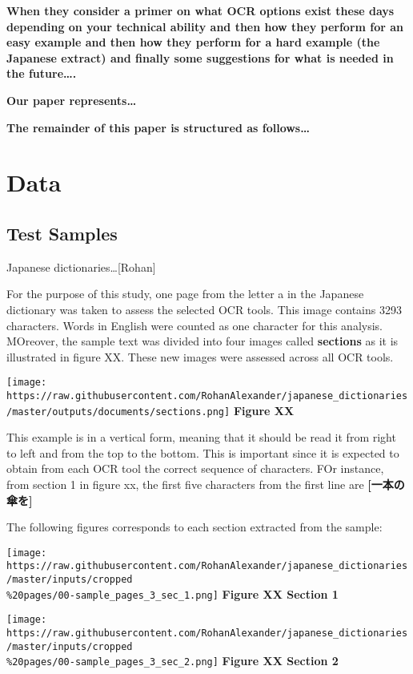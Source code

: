 \documentclass[
]{article}
\begin{document}
\textbf{When they consider a primer on what OCR options exist these days
depending on your technical ability and then how they perform for an
easy example and then how they perform for a hard example (the Japanese
extract) and finally some suggestions for what is needed in the
future\ldots.}

\textbf{Our paper represents\ldots{}}

\textbf{The remainder of this paper is structured as follows\ldots{}}

\hypertarget{data}{%
\section{Data}\label{data}}

\hypertarget{test-samples}{%
\subsection{Test Samples}\label{test-samples}}

Japanese dictionaries\ldots{[}Rohan{]}

For the purpose of this study, one page from the letter a in the
Japanese dictionary was taken to assess the selected OCR tools. This
image contains 3293 characters. Words in English were counted as one
character for this analysis. MOreover, the sample text was divided into
four images called \textbf{sections} as it is illustrated in figure XX.
These new images were assessed across all OCR tools.

\texttt{[image: https://raw.githubusercontent.com/RohanAlexander/japanese\_dictionaries/master/outputs/documents/sections.png]}
\textbf{Figure XX}

This example is in a vertical form, meaning that it should be read it
from right to left and from the top to the bottom. This is important
since it is expected to obtain from each OCR tool the correct sequence
of characters. FOr instance, from section 1 in figure xx, the first five
characters from the first line are \textbf{{[}一本の傘を{]}}

The following figures corresponds to each section extracted from the
sample:

\texttt{[image: https://raw.githubusercontent.com/RohanAlexander/japanese\_dictionaries/master/inputs/cropped\\\%20pages/00-sample\_pages\_3\_sec\_1.png]}
\textbf{Figure XX Section 1}

\texttt{[image: https://raw.githubusercontent.com/RohanAlexander/japanese\_dictionaries/master/inputs/cropped\\\%20pages/00-sample\_pages\_3\_sec\_2.png]}
\textbf{Figure XX Section 2}
\end{document}
